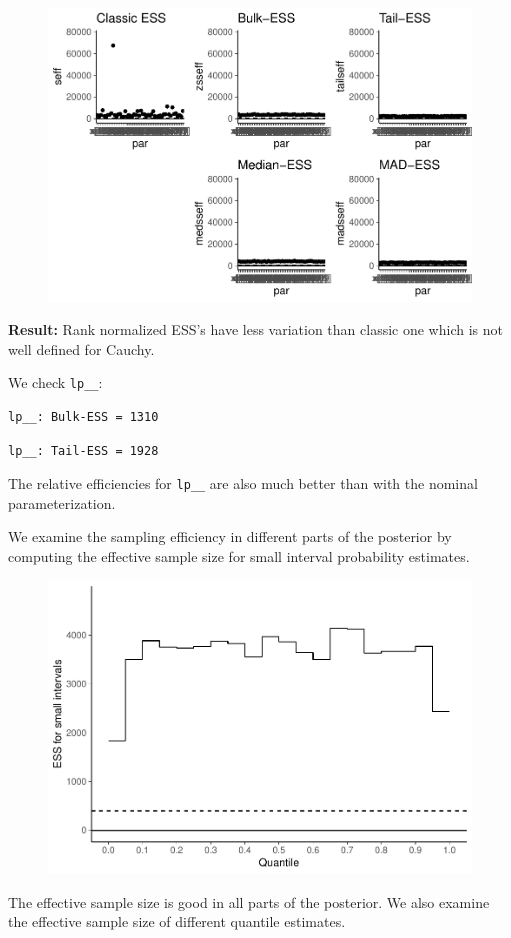 \documentclass[american,]{article}
\begin{document}
\begin{figure}[tp]
  \centering
  \includegraphics[width=0.6\linewidth]{graphics/ess-fit-alt1-1.pdf}
\end{figure}

\textbf{Result:} Rank normalized ESS's have less variation than classic
one which is not well defined for Cauchy.

We check \texttt{lp\_\_}:

\begin{verbatim}
lp__: Bulk-ESS = 1310
\end{verbatim}

\begin{verbatim}
lp__: Tail-ESS = 1928
\end{verbatim}

The relative efficiencies for \texttt{lp\_\_} are also much better than
with the nominal parameterization.

We examine the sampling efficiency in different parts of the posterior
by computing the effective sample size for small interval probability
estimates.

\begin{figure}[tp]
  \centering
  \includegraphics[width=0.6\linewidth]{graphics/local-ess-fit-alt1-2-1.pdf}
\end{figure}

The effective sample size is good in all parts of the posterior. We also
examine the effective sample size of different quantile estimates.
\end{document}

